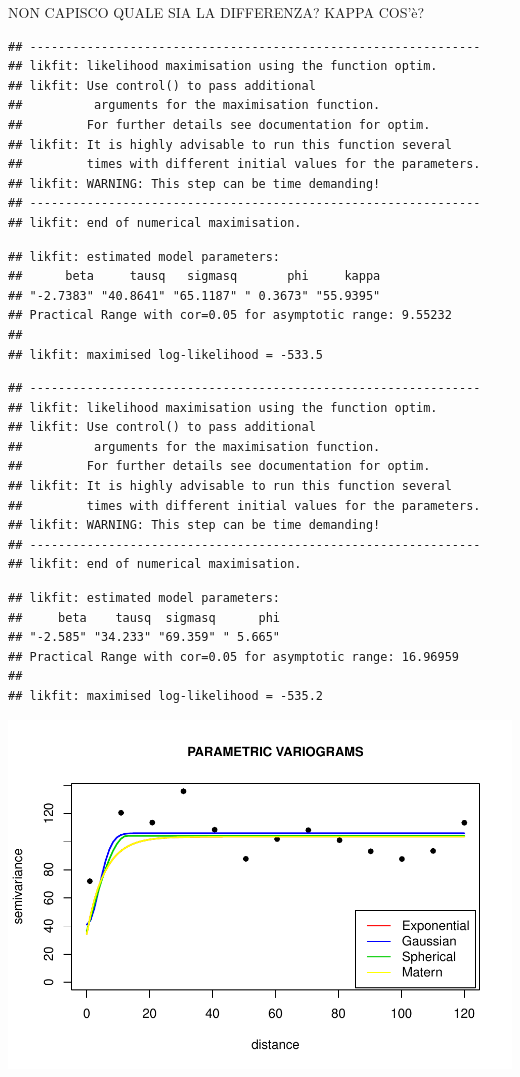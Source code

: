 \documentclass[
]{article}
\begin{document}
NON CAPISCO QUALE SIA LA DIFFERENZA? KAPPA COS'è?

\begin{verbatim}
## ---------------------------------------------------------------
## likfit: likelihood maximisation using the function optim.
## likfit: Use control() to pass additional
##          arguments for the maximisation function.
##         For further details see documentation for optim.
## likfit: It is highly advisable to run this function several
##         times with different initial values for the parameters.
## likfit: WARNING: This step can be time demanding!
## ---------------------------------------------------------------
## likfit: end of numerical maximisation.
\end{verbatim}

\begin{verbatim}
## likfit: estimated model parameters:
##      beta     tausq   sigmasq       phi     kappa 
## "-2.7383" "40.8641" "65.1187" " 0.3673" "55.9395" 
## Practical Range with cor=0.05 for asymptotic range: 9.55232
## 
## likfit: maximised log-likelihood = -533.5
\end{verbatim}

\begin{verbatim}
## ---------------------------------------------------------------
## likfit: likelihood maximisation using the function optim.
## likfit: Use control() to pass additional
##          arguments for the maximisation function.
##         For further details see documentation for optim.
## likfit: It is highly advisable to run this function several
##         times with different initial values for the parameters.
## likfit: WARNING: This step can be time demanding!
## ---------------------------------------------------------------
## likfit: end of numerical maximisation.
\end{verbatim}

\begin{verbatim}
## likfit: estimated model parameters:
##     beta    tausq  sigmasq      phi 
## "-2.585" "34.233" "69.359" " 5.665" 
## Practical Range with cor=0.05 for asymptotic range: 16.96959
## 
## likfit: maximised log-likelihood = -535.2
\end{verbatim}

\includegraphics{Assignment_1_files/figure-latex/unnamed-chunk-40-1.pdf}
\end{document}
